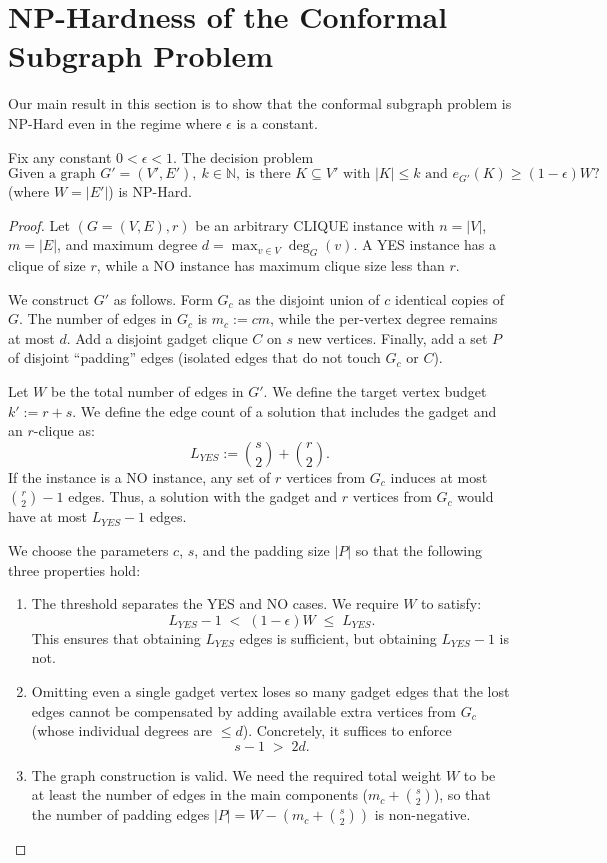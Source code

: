 \section{NP-Hardness of the Conformal Subgraph Problem}
\label{app:np-hard}
Our main result in this section is to show that the conformal subgraph problem is {\sc NP-Hard} even in the regime where $\epsilon$ is a constant.

\begin{theorem}
Fix any constant $0<\epsilon<1$.
The decision problem
\[
\text{Given a graph }G'=(V',E'),\ k\in\mathbb N,\ \text{is there }K\subseteq V'
\text{ with }|K|\le k\text{ and }e_{G'}(K)\ge(1-\epsilon)W?
\]
(where $W=|E'|$) is {\sc NP-Hard}.
\end{theorem}
\begin{proof}
Let $(G=(V,E),r)$ be an arbitrary CLIQUE instance with $n=|V|$, $m=|E|$, and maximum degree $d=\max_{v\in V}\deg_G(v)$. A YES instance has a clique of size $r$, while a NO instance has maximum clique size less than $r$.

We construct $G'$ as follows. Form $G_c$ as the disjoint union of $c$ identical copies of $G$. The number of edges in $G_c$ is $m_c := c m$, while the per-vertex degree remains at most $d$. Add a disjoint gadget clique $C$ on $s$ new vertices. Finally, add a set $P$ of disjoint ``padding'' edges (isolated edges that do not touch $G_c$ or $C$).

Let $W$ be the total number of edges in $G'$. We define the target vertex budget $k' := r + s$.
We define the edge count of a solution that includes the gadget and an $r$-clique as:
\[ L_{YES} := \binom{s}{2} + \binom{r}{2}. \]
If the instance is a NO instance, any set of $r$ vertices from $G_c$ induces at most $\binom{r}{2}-1$ edges. Thus, a solution with the gadget and $r$ vertices from $G_c$ would have at most $L_{YES}-1$ edges.

We choose the parameters $c$, $s$, and the padding size $|P|$ so that the following three properties hold:
\begin{enumerate}
  \item[(P1)] The threshold separates the YES and NO cases. We require $W$ to satisfy:
    \begin{equation}\label{eq:P1}
      L_{YES} - 1 \;<\; (1-\epsilon)W \;\le\; L_{YES}.
    \end{equation}
    This ensures that obtaining $L_{YES}$ edges is sufficient, but obtaining $L_{YES}-1$ is not.
  \item[(P2)] Omitting even a single gadget vertex loses so many gadget
    edges that the lost edges cannot be compensated by adding available
    extra vertices from $G_c$ (whose individual degrees are $\le d$).
    Concretely, it suffices to enforce
    \begin{equation}\label{eq:P2}
      s-1 \;>\; 2 d.
    \end{equation}
  \item[(P3)] The graph construction is valid. We need the required total weight $W$ to be at least the number of edges in the main components ($m_c + \binom{s}{2}$), so that the number of padding edges $|P| = W - (m_c + \binom{s}{2})$ is non-negative.
\end{enumerate}


\end{proof}
